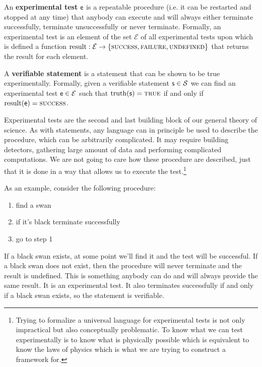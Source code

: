\documentclass[11pt,letterpaper,fleqn]{memoir} %
\begin{document}
\begin{mathSection}
\begin{axiom}\label{def_experimental_tests}
	An \textbf{experimental test} $\mathsf{e}$ is a repeatable procedure (i.e. it can be restarted and stopped at any time) that anybody can execute and will always either terminate successfully, terminate unsuccessfully or never terminate. Formally, an experimental test is an element of the set $\mathcal{E}$ of all experimental tests upon which is defined a function $\operatorname{result}: \mathcal{E} \to \{\textsc{success}, \textsc{failure}, \textsc{undefined}\}$ that returns the result for each element.
\end{axiom}
\begin{defn}
	A \textbf{verifiable statement} is a statement that can be shown to be true experimentally. Formally, given a verifiable statement $\mathsf{s} \in \mathcal{S}$ we can find an experimental test $\mathsf{e} \in \mathcal{E}$ such that $\operatorname{truth}(\mathsf{s})=\textsc{true}$ if and only if $\operatorname{result}(\mathsf{e})=\textsc{success}$.
\end{defn}
\end{mathSection}

Experimental tests are the second and last building block of our general theory of science. As with statements, any language can in principle be used to describe the procedure, which can be arbitrarily complicated. It may require building detectors, gathering large amount of data and performing complicated computations. We are not going to care how these procedure are described, just that it is done in a way that allows us to execute the test.\footnote{Trying to formalize a universal language for experimental tests is not only impractical but also conceptually problematic. To know what we can test experimentally is to know what is physically possible which is equivalent to know the laws of physics which is what we are trying to construct a framework for.}

As an example, consider the following procedure:
\begin{enumerate}
	\item find a swan
	\item if it's black terminate successfully
	\item go to step 1
\end{enumerate}
If a black swan exists, at some point we'll find it and the test will be successful. If a black swan does not exist, then the procedure will never terminate and the result is undefined. This is something anybody can do and will always provide the same result. It is an experimental test. It also terminates successfully if and only if a black swan exists, so the statement  is verifiable.
\end{document}
